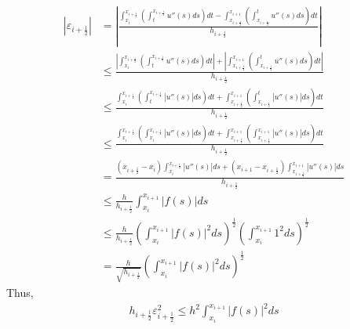 \documentclass[a4paper]{article}
\numberwithin{equation}{section}
\begin{document}
\begin{align}
\left| {{\varepsilon _{i + \frac{1}{2}}}} \right| &= \left| {\frac{{\int_{{x_i}}^{{x_{i + \frac{1}{2}}}} {\left( {\int_t^{{x_{i + \frac{1}{2}}}} {u''\left( s \right)ds} } \right)dt}  - \int_{{x_{i + \frac{1}{2}}}}^{{x_{i + 1}}} {\left( {\int_{{x_{i + \frac{1}{2}}}}^t {u''\left( s \right)ds} } \right)dt} }}{{{h_{i + \frac{1}{2}}}}}} \right|\\
 &\le \frac{{\left| {\int_{{x_i}}^{{x_{i + \frac{1}{2}}}} {\left( {\int_t^{{x_{i + \frac{1}{2}}}} {u''\left( s \right)ds} } \right)dt} } \right| + \left| {\int_{{x_{i + \frac{1}{2}}}}^{{x_{i + 1}}} {\left( {\int_{{x_{i + \frac{1}{2}}}}^t {u''\left( s \right)ds} } \right)dt} } \right|}}{{{h_{i + \frac{1}{2}}}}}\\
& \le \frac{{\int_{{x_i}}^{{x_{i + \frac{1}{2}}}} {\left( {\int_t^{{x_{i + \frac{1}{2}}}} {\left| {u''\left( s \right)} \right|ds} } \right)dt}  + \int_{{x_{i + \frac{1}{2}}}}^{{x_{i + 1}}} {\left( {\int_{{x_{i + \frac{1}{2}}}}^t {\left| {u''\left( s \right)} \right|ds} } \right)dt} }}{{{h_{i + \frac{1}{2}}}}}\\
& \le \frac{{\int_{{x_i}}^{{x_{i + \frac{1}{2}}}} {\left( {\int_{{x_i}}^{{x_{i + \frac{1}{2}}}} {\left| {u''\left( s \right)} \right|ds} } \right)dt}  + \int_{{x_{i + \frac{1}{2}}}}^{{x_{i + 1}}} {\left( {\int_{{x_{i + \frac{1}{2}}}}^{{x_{i + 1}}} {\left| {u''\left( s \right)} \right|ds} } \right)dt} }}{{{h_{i + \frac{1}{2}}}}}\\
& = \frac{{\left( {{x_{i + \frac{1}{2}}} - {x_i}} \right)\int_{{x_i}}^{{x_{i + \frac{1}{2}}}} {\left| {u''\left( s \right)} \right|ds}  + \left( {{x_{i + 1}} - {x_{i + \frac{1}{2}}}} \right)\int_{{x_{i + \frac{1}{2}}}}^{{x_{i + 1}}} {\left| {u''\left( s \right)} \right|ds} }}{{{h_{i + \frac{1}{2}}}}}\\
& \le \frac{h}{{{h_{i + \frac{1}{2}}}}}\int_{{x_i}}^{{x_{i + 1}}} {\left| {f\left( s \right)} \right|ds} \\
& \le \frac{h}{{{h_{i + \frac{1}{2}}}}}{\left( {\int_{{x_i}}^{{x_{i + 1}}} {{{\left| {f\left( s \right)} \right|}^2}ds} } \right)^{\frac{1}{2}}}{\left( {\int_{{x_i}}^{{x_{i + 1}}} {{1^2}ds} } \right)^{\frac{1}{2}}}\\
& = \frac{h}{{\sqrt {{h_{i + \frac{1}{2}}}} }}{\left( {\int_{{x_i}}^{{x_{i + 1}}} {{{\left| {f\left( s \right)} \right|}^2}ds} } \right)^{\frac{1}{2}}}
\end{align}
Thus,
\begin{align}
\label{4.177}
{h_{i + \frac{1}{2}}}\varepsilon _{i + \frac{1}{2}}^2 \le h^2 \int_{{x_i}}^{{x_{i + 1}}} {{{\left| {f\left( s \right)} \right|}^2}ds} 
\end{align}
\end{document}
